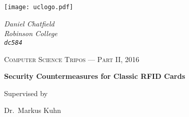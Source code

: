 \documentclass[final,dissertation.tex]{subfiles}
\begin{document}
  \begin{titlepage}

    \begin{minipage}[t][][t]{0.5\textwidth}
      \texttt{[image: uclogo.pdf]}
    \end{minipage}
    \begin{minipage}{0.5\textwidth}
      \begin{flushright}
        \large
        \textit{Daniel Chatfield}
        \\
        \textit{Robinson College}
        \\
        \texttt{\textit{dc584}}
      \end{flushright}
    \end{minipage}

    \vfill

    \begin{center}

      {\scshape Computer Science Tripos --- Part II, 2016}

      {\huge\bfseries Security Countermeasures for \mifare{} Classic RFID Cards\par}

      \vfill
      Supervised by\par
      Dr.~Markus Kuhn

    \end{center}
  \end{titlepage}
\end{document}
